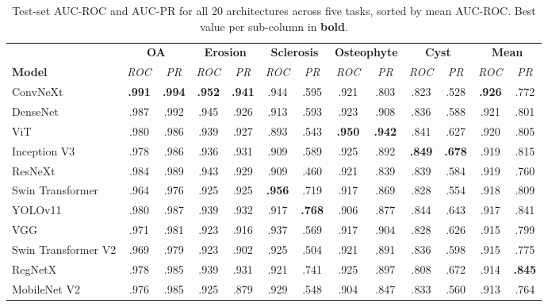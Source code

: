 \documentclass[review,12pt]{elsarticle}
\begin{document}
\begin{table}[htbp]
\centering
\caption{Test-set AUC-ROC and AUC-PR for all 20 architectures across five tasks,
sorted by mean AUC-ROC. Best value per sub-column in \textbf{bold}.}
\label{tab:model_summary}
\small
\setlength{\tabcolsep}{2.5pt}
\begin{tabular}{l cc cc cc cc cc cc}
\toprule
& \multicolumn{2}{c}{\textbf{OA}}
& \multicolumn{2}{c}{\textbf{Erosion}}
& \multicolumn{2}{c}{\textbf{Sclerosis}}
& \multicolumn{2}{c}{\textbf{Osteophyte}}
& \multicolumn{2}{c}{\textbf{Cyst}}
& \multicolumn{2}{c}{\textbf{Mean}} \\
\cmidrule(lr){2-3}\cmidrule(lr){4-5}\cmidrule(lr){6-7}\cmidrule(lr){8-9}\cmidrule(lr){10-11}\cmidrule(lr){12-13}
\textbf{Model}
& \textit{ROC} & \textit{PR}
& \textit{ROC} & \textit{PR}
& \textit{ROC} & \textit{PR}
& \textit{ROC} & \textit{PR}
& \textit{ROC} & \textit{PR}
& \textit{ROC} & \textit{PR} \\
\midrule
ConvNeXt            & \textbf{.991} & \textbf{.994} & \textbf{.952} & \textbf{.941} & .944 & .595 & .921 & .803 & .823 & .528 & \textbf{.926} & .772 \\
DenseNet            & .987 & .992 & .945 & .926 & .913 & .593 & .923 & .908 & .836 & .588 & .921 & .801 \\
ViT                 & .980 & .986 & .939 & .927 & .893 & .543 & \textbf{.950} & \textbf{.942} & .841 & .627 & .920 & .805 \\
Inception V3        & .978 & .986 & .936 & .931 & .909 & .589 & .925 & .892 & \textbf{.849} & \textbf{.678} & .919 & .815 \\
ResNeXt             & .984 & .989 & .943 & .929 & .909 & .460 & .921 & .839 & .839 & .584 & .919 & .760 \\
Swin Transformer    & .964 & .976 & .925 & .925 & \textbf{.956} & .719 & .917 & .869 & .828 & .554 & .918 & .809 \\
YOLOv11             & .980 & .987 & .939 & .932 & .917 & \textbf{.768} & .906 & .877 & .844 & .643 & .917 & .841 \\
VGG                 & .971 & .981 & .923 & .916 & .937 & .569 & .917 & .904 & .828 & .626 & .915 & .799 \\
Swin Transformer V2 & .969 & .979 & .923 & .902 & .925 & .504 & .921 & .891 & .836 & .598 & .915 & .775 \\
RegNetX             & .978 & .985 & .939 & .931 & .921 & .741 & .925 & .897 & .808 & .672 & .914 & \textbf{.845} \\
MobileNet V2        & .976 & .985 & .925 & .879 & .929 & .548 & .904 & .847 & .833 & .560 & .913 & .764 \\

\end{tabular}
\end{table}
\end{document}

